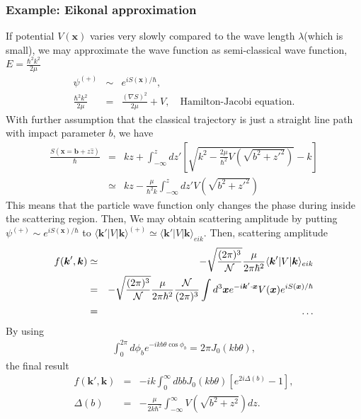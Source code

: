 \documentclass[10pt]{book}
\def\bm{\boldsymbol}
\newcommand{\bea}{\begin{eqnarray}}
\newcommand{\eea}{\end{eqnarray}}
\newcommand{\no}{\nonumber \\}
\def\vk{{\bm k}}
\def\vx{{\bm x}}
\def\la{\langle}
\def\ra{\rangle}
\begin{document}
\subsubsection{Example: Eikonal approximation}
If potential $V(\vx)$ varies very slowly compared to the wave length $\lambda$(which is small),
we may approximate the wave function as semi-classical wave function, $E=\frac{\hbar^2 k^2}{2\mu}$
\bea 
\psi^{(+)}&\sim& e^{i S(\vx)/\hbar}, \no 
\frac{\hbar^2 k^2}{2\mu}&=&\frac{(\nabla S)^2}{2\mu}+V, \quad \mbox{Hamilton-Jacobi equation}. 
\eea 
With further assumption that the classical trajectory is just a straight line path
with impact parameter $b$, we have
\bea 
\frac{S(\vx={\bm b}+z\hat{z})}{\hbar}&=& kz+\int_{-\infty}^z d z' \left[\sqrt{k^2-\frac{2\mu}{\hbar^2} V(\sqrt{b^2+z'^2})}-k\right]\no  
      &\simeq & kz -\frac{\mu}{\hbar^2 k}\int_{-\infty}^z d z' V(\sqrt{b^2+z'^2})
\eea 
This means that the particle wave function only changes
the phase during inside the scattering region.
Then, We may obtain scattering amplitude by putting $\psi^{(+)}\sim e^{i S(\vx)/\hbar}$
to $\la \vk'|V|\vk\ra^{(+)}\simeq \la \vk'|V|\vk\ra_{eik}$.
Then, scattering amplitude
\bea 
f(\vk',\vk)&\simeq& -\sqrt{ \frac{(2\pi)^3} {\cal N}}\frac{\mu}{2\pi\hbar^2}\la \vk'|V|\vk\ra_{eik} \no 
& =&  -\sqrt{ \frac{(2\pi)^3} {\cal N}}\frac{\mu}{2\pi\hbar^2}
    \frac{\cal N}{(2\pi)^3}
    \int d^3\vx e^{-i\vk'\cdot\vx}V(\vx)e^{iS(\vx)/\hbar} \no 
&=&   \dots     
\eea 
By using 
\bea 
\int_0^{2\pi} d\phi_b e^{-ikb\theta \cos\phi_b }=2\pi J_0(kb\theta),
\eea  
the final result
\bea 
f(\vk',\vk)&=&-ik\int_0^\infty db b J_0(kb\theta)[e^{2i\Delta(b)}-1],\no 
\Delta(b)&=& -\frac{\mu}{2k\hbar^2}\int_{-\infty}^{\infty} V(\sqrt{b^2+z^2}) dz.
\eea 
\end{document}
